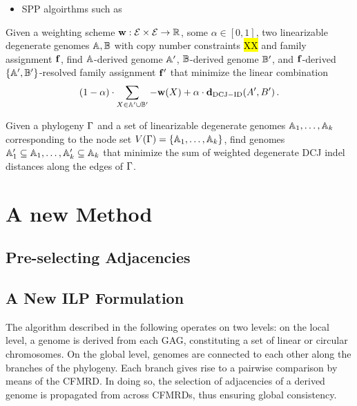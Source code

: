 \documentclass[runningheads]{llncs}
\begin{document}
\begin{itemize}
    \item SPP algoirthms such as 
\end{itemize}

\begin{problem}\label{prb:wdeg_dcj}
    Given a weighting scheme $\mathbf{w} : \mathcal{E} \times \mathcal{E} \to \mathbb R$, some $\alpha \in [0, 1]$, two linearizable degenerate genomes $\mathbb{A}, \mathbb{B}$ with copy number constraints \hl{XX} and family assignment $\mathbf{f}$, find $\mathbb{A}$-derived genome $\mathbb{A}'$, $\mathbb{B}$-derived genome $\mathbb{B}'$, and $\mathbf{f}$-derived $\{\mathbb{A}',\mathbb{B}'\}$-resolved family assignment $\mathbf{f}'$ that minimize the linear combination
    $$
    (1-\alpha) \cdot \sum_{X \in \mathbb{A}' \cup \mathbb{B}'} -\mathbf{w}(X) + \alpha \cdot \mathbf{d}_{\mathrm{DCJ-ID}}(A', B')\,.
    $$
\end{problem}

\begin{problem}\label{prb:spp_dcj}
    Given a phylogeny $\Gamma$ and a set of linearizable degenerate genomes $\mathbb{A}_1, \ldots, \mathbb{A}_k$ corresponding to the node set $V(\Gamma) = \{\mathbb{A}_1, \ldots, \mathbb{A}_k\}$, find genomes $\mathbb{A}'_1 \subseteq \mathbb{A}_1, \ldots, \mathbb{A}'_k \allowbreak \subseteq \mathbb{A}_k$ that minimize the sum of weighted degenerate DCJ indel distances along the edges of $\Gamma$. 
\end{problem}

\section{A new Method}
\subsection{Pre-selecting Adjacencies}
\subsection{A New ILP Formulation}



The algorithm described in the following operates on two levels: 
on the local level, a genome is derived from each GAG, constituting a set of linear or circular chromosomes. 
On the global level, genomes are connected to each other along the branches of the phylogeny. Each branch gives rise to a pairwise comparison by means of the CFMRD. 
In doing so, the selection of adjacencies of a derived genome is propagated from across CFMRDs, thus ensuring global consistency. 
\end{document}
